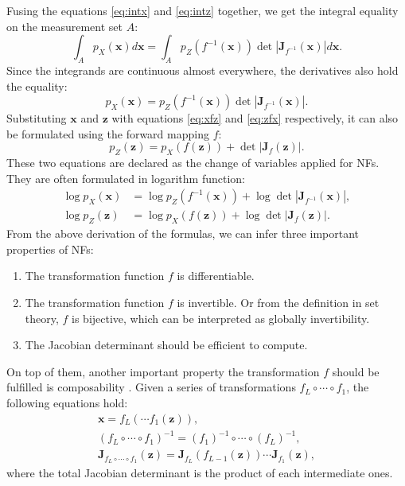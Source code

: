 Fusing the equations \ref{eq:intx} and \ref{eq:intz} together, we get the integral equality on the measurement set $A$:
\begin{equation}
    \int_A p_X(\boldsymbol{x})d\boldsymbol{x}=\int_A p_Z(f^{-1}(\boldsymbol{x}))\det\left|\boldsymbol{J}_{f^{-1}}(\boldsymbol{x})\right|d\boldsymbol{x}.
\end{equation}
Since the integrands are continuous almost everywhere, the derivatives also hold the equality:
\begin{equation}
    \label{eq:xnfz}
    p_X(\boldsymbol{x}) = p_Z(f^{-1}(\boldsymbol{x}))\det\left|\boldsymbol{J}_{f^{-1}}(\boldsymbol{x})\right|.
\end{equation}
Substituting $\boldsymbol{x}$ and $\boldsymbol{z}$ with equations \ref{eq:xfz} and \ref{eq:zfx} respectively, it can also be formulated using the forward mapping $f$:
\begin{equation}
    \label{eq:znfx}
    p_Z(\boldsymbol{z}) = p_X(f(\boldsymbol{z}))+\det\left|\boldsymbol{J}_f(\boldsymbol{z})\right|.
\end{equation}
These two equations are declared as the change of variables applied for \acp{NF}. They are often formulated in logarithm function:
\begin{align}
    \label{eq:nfchangeofvariables}
    \log p_X(\boldsymbol{x}) &= \log p_Z(f^{-1}(\boldsymbol{x}))+\log\det\left|\boldsymbol{J}_{f^{-1}}(\boldsymbol{x})\right|,\\
    \log p_Z(\boldsymbol{z}) &= \log p_X(f(\boldsymbol{z}))+\log\det\left|\boldsymbol{J}_f(\boldsymbol{z})\right|.
\end{align}
From the above derivation of the formulas, we can infer three important properties of \acp{NF}:
\begin{enumerate}
    \item[(1)]The transformation function $f$ is differentiable.
    \item[(2)]The transformation function $f$ is invertible. Or from the definition in set theory, $f$ is bijective, which can be interpreted as globally invertibility. 
    \item[(3)]The Jacobian determinant should be efficient to compute. 
\end{enumerate}
On top of them, another important property the transformation $f$ should be fulfilled is composability \citep{papamakarios2021nf}. Given a series of transformations $f_{L}\circ\cdots\circ f_{1}$, the following equations hold:
\begin{subequations}
    \begin{gather}
        \boldsymbol{x}=f_L(\cdots f_{1}(\boldsymbol{z})),\\
        (f_{L}\circ\cdots\circ f_{1})^{-1}=(f_1)^{-1}\circ\cdots\circ (f_{L})^{-1},\\
        \boldsymbol{J}_{f_{L}\circ\cdots\circ f_{1}}(\boldsymbol{z})=\boldsymbol{J}_{f_L}(f_{L-1}(\boldsymbol{z}))\cdots\boldsymbol{J}_{f_1}(\boldsymbol{z}),
    \end{gather}
\end{subequations}
where the total Jacobian determinant is the product of each intermediate ones.
